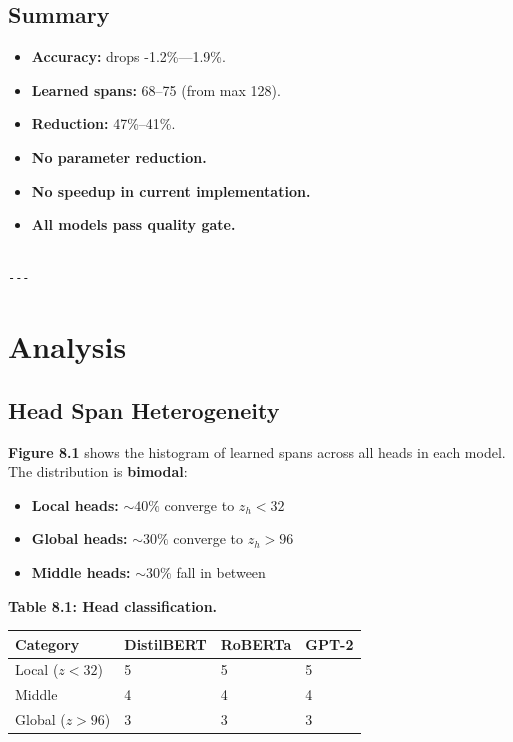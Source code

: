 \subsection{Summary}

\begin{itemize}
\item \textbf{Accuracy:} drops -1.2\%---1.9\%.
\item \textbf{Learned spans:} 68--75 (from max 128).
\item \textbf{Reduction:} 47\%--41\%.
\item \textbf{No parameter reduction.}
\item \textbf{No speedup in current implementation.}
\item \textbf{All models pass quality gate.}
\end{itemize}
\begin{lstlisting}

---
\end{lstlisting}


\section{Analysis}

\subsection{Head Span Heterogeneity}

\textbf{Figure 8.1} shows the histogram of learned spans across all heads in each 
model. The distribution is \textbf{bimodal}:

\begin{itemize}
\item \textbf{Local heads:} $\sim 40\%$ converge to $z_h < 32$
\item \textbf{Global heads:} $\sim 30\%$ converge to $z_h > 96$
\item \textbf{Middle heads:} $\sim 30\%$ fall in between

\end{itemize}
\textbf{Table 8.1: Head classification.}

\begin{table}[H]
\centering
\small
\begin{tabular}{llll}
\toprule
\textbf{Category} & \textbf{DistilBERT} & \textbf{RoBERTa} & \textbf{GPT-2} \\
\midrule
Local ($z < 32$) & 5 & 5 & 5 \\
Middle & 4 & 4 & 4 \\
Global ($z > 96$) & 3 & 3 & 3 \\
\bottomrule
\end{tabular}
\end{table}

